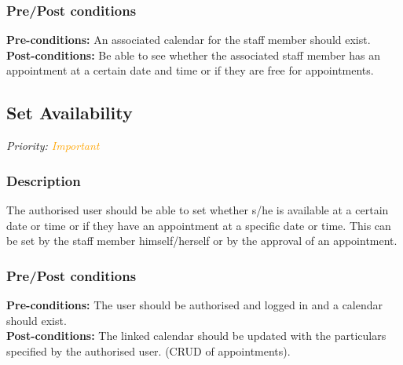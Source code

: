 	\subsubsection{Pre/Post conditions}
		\textbf{Pre-conditions:} An associated calendar for the staff member should exist.\\
		\textbf{Post-conditions:} Be able to see whether the associated staff member has an appointment at a certain date and time or if they are free for appointments. 
	
\subsection{Set Availability}
\textit{Priority: \textcolor{orange}{Important}}
	\subsubsection{Description}
	The authorised user should be able to set whether s/he is available at a certain date or time or if they have an appointment at a specific date or time. This can be set by the staff member himself/herself or by the approval of an appointment.\\
	\subsubsection{Pre/Post conditions}
		\textbf{Pre-conditions:} The user should be authorised and logged in and a calendar should exist.\\
		\textbf{Post-conditions:} The linked calendar should be updated with the particulars specified by the authorised user. (CRUD of appointments).